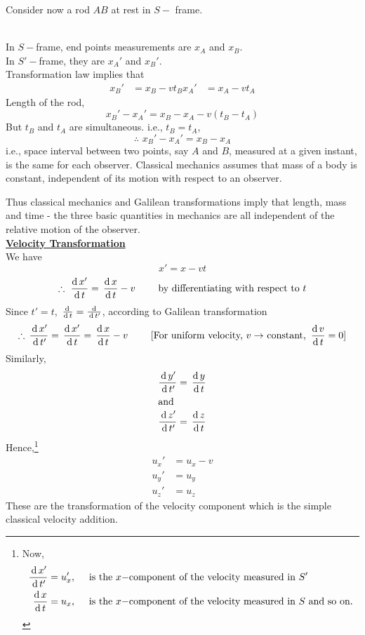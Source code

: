 \documentclass[../main-sheet.tex]{subfiles}
\begin{document}
\begin{soln}
Consider now a rod \(AB \) at rest in \(S-\) frame.\hspace{3cm}\\
In \(S-\)frame, end points measurements are \(x_A \) and \(x_B \).\\
In \(S'-\)frame, they are \(x_A' \) and \(x_B' \).\\
Transformation law implies that
\begin{align*}
    x_B'&=x_B-vt_B
    x_A'&=x_A-vt_A
\end{align*}
Length of the rod,
\[x_B'-x_A'=x_B-x_A-v(t_B-t_A )\]
But \(t_B \) and \(t_A \) are simultaneous. i.e., \(t_B=t_A \),
\[\therefore\,\,x_B'-x_A'=x_B-x_A\]
i.e., space interval between two points, say \(A \) and \(B \), measured at a given instant, is the same for each observer. Classical mechanics assumes that mass of a body is constant, independent of its motion with respect to an observer.

Thus classical mechanics and Galilean transformations imply that length, mass and time - the three basic quantities in mechanics are all independent of the relative motion of the observer.\\


\underline{\textbf{Velocity Transformation}}\\
We have 
\[x'=x-vt \]
\[\therefore \,\,\frac{\mathrm{d}\,x'}{\mathrm{d}\,t}=\,\frac{\mathrm{d}\,x}{\mathrm{d}\,t}-v\qquad \text{ by differentiating with respect to  } t\]
Since \(t'=t \), \(\,\frac{\mathrm{d}\,}{\mathrm{d}\,t}=\frac{\,\mathrm{d}\, }{\,\mathrm{d}\, t'}\), \hspace{2cm} according to Galilean transformation
\[\therefore\, \frac{\,\mathrm{d}\, x'}{\,\mathrm{d}\, t' }=\,\frac{\mathrm{d}\,x'}{\mathrm{d}\,t}=\,\frac{\mathrm{d}\,x}{\mathrm{d}\,t}-v\qquad \text{ [For uniform velocity, \(v\to\) constant, \(\displaystyle\,\frac{\mathrm{d}\,v}{\mathrm{d}\,t}=0\)]}\]
Similarly,
\begin{align*}
    \frac{\,\mathrm{d}\, y'}{\,\mathrm{d}\, t'}&=\,\frac{\mathrm{d}\,y   }{\mathrm{d}\,t}\\
    \intertext{and}
    \frac{\,\mathrm{d}\, z'}{\,\mathrm{d}\, t'}&=\,\frac{\mathrm{d}\,z   }{\mathrm{d}\,t}
\end{align*}
Hence,\footnote{Now,
\begin{align*}
    \frac{\,\mathrm{d}\, x'}{\,\mathrm{d}\, t'}&=u_x',\quad \text{ is the \(x-\)component of the velocity measured in \(S'\)}\\
    \,\frac{\mathrm{d}\,x}{\mathrm{d}\,t}&=u_x,\quad \text{ is the \(x-\)component of the velocity measured in \(S\) and so on.}
\end{align*}}
\begin{align*}
    u_x'&=u_x-v\\
    u_y'&=u_y\\
    u_z'&=u_z
\end{align*}
These are the transformation of the velocity component which is the simple classical velocity addition.



\end{soln}
\end{document}
